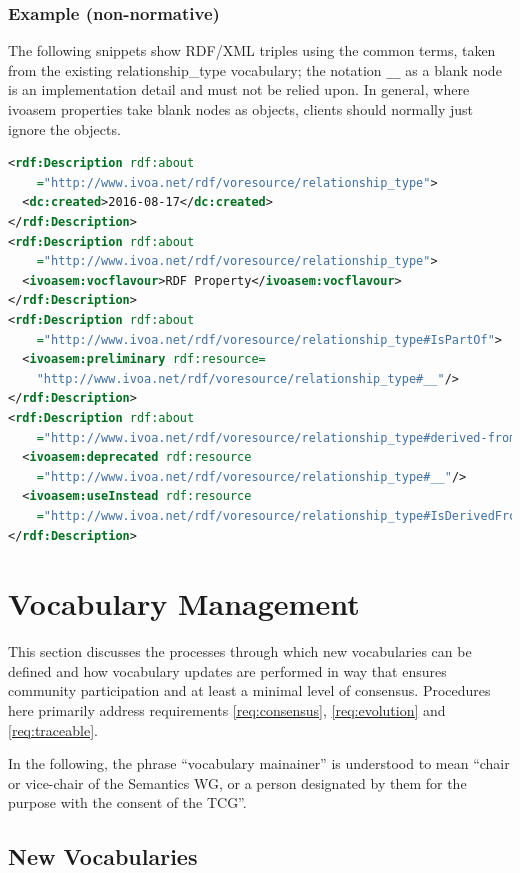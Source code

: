 \documentclass[11pt,a4paper]{ivoa}
\begin{document}
\subsubsection{Example (non-normative)}

The following snippets show RDF/XML triples using the common terms,
taken from the existing relationship\_type vocabulary; the notation
\verb|__| as a blank node is an implementation detail and must not be
relied upon.  In general, where ivoasem properties take blank nodes as
objects, clients should normally just ignore the objects.

\begin{lstlisting}[language=XML]
<rdf:Description rdf:about
    ="http://www.ivoa.net/rdf/voresource/relationship_type">
  <dc:created>2016-08-17</dc:created>
</rdf:Description>
<rdf:Description rdf:about
    ="http://www.ivoa.net/rdf/voresource/relationship_type">
  <ivoasem:vocflavour>RDF Property</ivoasem:vocflavour>
</rdf:Description>
<rdf:Description rdf:about
    ="http://www.ivoa.net/rdf/voresource/relationship_type#IsPartOf">
  <ivoasem:preliminary rdf:resource=
    "http://www.ivoa.net/rdf/voresource/relationship_type#__"/>
</rdf:Description>
<rdf:Description rdf:about
    ="http://www.ivoa.net/rdf/voresource/relationship_type#derived-from">
  <ivoasem:deprecated rdf:resource
    ="http://www.ivoa.net/rdf/voresource/relationship_type#__"/>
  <ivoasem:useInstead rdf:resource
    ="http://www.ivoa.net/rdf/voresource/relationship_type#IsDerivedFrom"/>
</rdf:Description>
\end{lstlisting}


\section{Vocabulary Management}
\label{sect:management}

This section discusses the processes through which new vocabularies can be
defined and how vocabulary updates are performed in way
that ensures community participation and at least a minimal level of
consensus. Procedures here primarily address requirements
\ref{req:consensus}, \ref{req:evolution} and \ref{req:traceable}.

In the following, the phrase 
``vocabulary mainainer'' is understood
to mean ``chair or vice-chair of the Semantics WG, or a person
designated by them for the purpose with the consent of the TCG''.


\subsection{New Vocabularies}
\label{sect:new-vocabularies}
\end{document}

